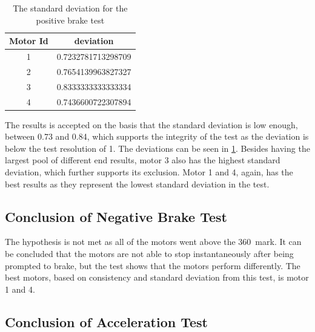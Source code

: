\begin{table}
  \centering
  \begin{tabular}{| c | c | }
    \hline
    Motor Id & deviation   \\ \hline
    1 & 0.7232781713298709 \\ \hline
    2 & 0.7654139963827327 \\ \hline
    3 & 0.8333333333333334 \\ \hline
    4 & 0.7436600722307894 \\ \hline
  \end{tabular}
  \caption{The standard deviation for the positive brake test}
  \label{tbl:test_deviation_brake_negative}
\end{table}   

The results is accepted on the basis that the standard deviation is low enough, between 0.73 and 0.84, which supports the integrity of the test as the deviation is below the test resolution of 1\degree. The deviations can be seen in \cref{tbl:test_deviation_brake_negative}. Besides having the largest pool of different end results, motor 3 also has the highest standard deviation, which further supports its exclusion. Motor 1 and 4, again, has the best results as they represent the lowest standard deviation in the test. 

\subsection{Conclusion of Negative Brake Test}
The hypothesis is not met as all of the motors went above the 360\degree\ mark. It can be concluded that the motors are not able to stop instantaneously after being prompted to brake, but the test shows that the motors perform differently. The best motors, based on consistency and standard deviation from this test, is motor 1 and 4.

\subsection{Conclusion of Acceleration Test}
